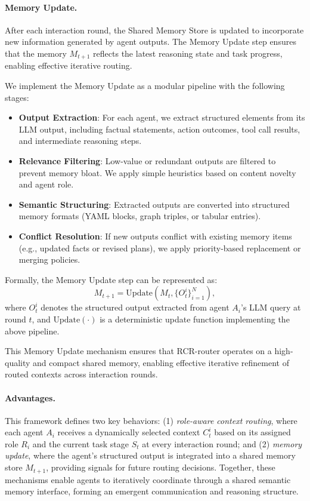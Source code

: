 \documentclass[letterpaper]{article} %
\begin{document}
\paragraph{Memory Update.}

After each interaction round, the Shared Memory Store is updated to incorporate new information generated by agent outputs. The Memory Update step ensures that the memory $M_{t+1}$ reflects the latest reasoning state and task progress, enabling effective iterative routing.

We implement the Memory Update as a modular pipeline with the following stages:

\begin{itemize}
    \item \textbf{Output Extraction}: For each agent, we extract structured elements from its LLM output, including factual statements, action outcomes, tool call results, and intermediate reasoning steps.
    \item \textbf{Relevance Filtering}: Low-value or redundant outputs are filtered to prevent memory bloat. We apply simple heuristics based on content novelty and agent role.
    \item \textbf{Semantic Structuring}: Extracted outputs are converted into structured memory formats (YAML blocks, graph triples, or tabular entries).
    \item \textbf{Conflict Resolution}: If new outputs conflict with existing memory items (e.g., updated facts or revised plans), we apply priority-based replacement or merging policies.
\end{itemize}

Formally, the Memory Update step can be represented as:
\begin{equation}
M_{t+1} = \text{Update}(M_t, \{ O_t^i \}_{i=1}^N),
\end{equation}
where $O_t^i$ denotes the structured output extracted from agent $A_i$'s LLM query at round $t$, and $\text{Update}(\cdot)$ is a deterministic update function implementing the above pipeline.

This Memory Update mechanism ensures that RCR-router operates on a high-quality and compact shared memory, enabling effective iterative refinement of routed contexts across interaction rounds. 

\paragraph{Advantages.}
This framework defines two key behaviors: (1) \textit{role-aware context routing}, where each agent $A_i$ receives a dynamically selected context $C_t^i$ based on its assigned role $R_i$ and the current task stage $S_t$ at every interaction round; and (2) \textit{memory update}, where the agent’s structured output is integrated into a shared memory store $M_{t+1}$, providing signals for future routing decisions. Together, these mechanisms enable agents to iteratively coordinate through a shared semantic memory interface, forming an emergent communication and reasoning structure.
\end{document}

